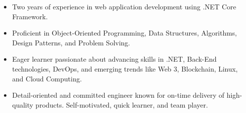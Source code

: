 


\begin{itemize}
    \item Two years of experience in web application development using .NET Core Framework.
    \item Proficient in Object-Oriented Programming, Data Structures, Algorithms, Design Patterns, and Problem Solving.
    \item Eager learner passionate about advancing skills in .NET, Back-End technologies, DevOps, and emerging trends like Web 3, Blockchain, Linux, and Cloud Computing.
    \item Detail-oriented and committed engineer known for on-time delivery of high-quality products. Self-motivated, quick learner, and team player.
\end{itemize}